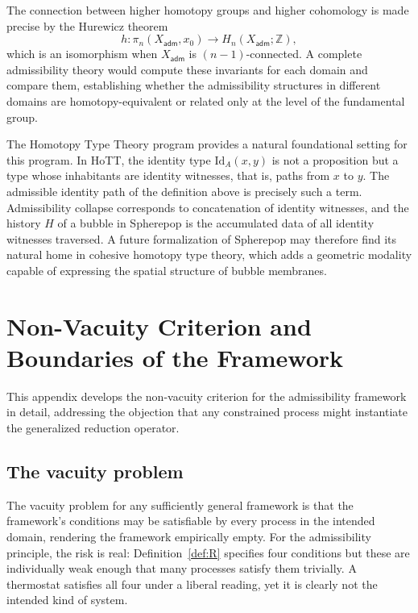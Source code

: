 \documentclass[12pt, a4paper]{article}
\theoremstyle{plain}
\theoremstyle{definition}
\theoremstyle{remark}
\begin{document}
The connection between higher homotopy groups and higher cohomology is made precise
by the Hurewicz theorem
\[
  h : \pi_n(X_{\mathsf{adm}}, x_0) \to H_n(X_{\mathsf{adm}}; \mathbb{Z}),
\]
which is an isomorphism when $X_{\mathsf{adm}}$ is $(n-1)$-connected. A complete
admissibility theory would compute these invariants for each domain and compare them,
establishing whether the admissibility structures in different domains are
homotopy-equivalent or related only at the level of the fundamental group.

The Homotopy Type Theory program provides a natural foundational setting for this
program. In HoTT, the identity type $\mathrm{Id}_A(x,y)$ is not a proposition but a
type whose inhabitants are identity witnesses, that is, paths from $x$ to $y$. The
admissible identity path of the definition above is precisely such a term.
Admissibility collapse corresponds to concatenation of identity witnesses, and the
history $H$ of a bubble in Spherepop is the accumulated data of all identity witnesses
traversed. A future formalization of Spherepop may therefore find its natural home in
cohesive homotopy type theory, which adds a geometric modality capable of expressing
the spatial structure of bubble membranes.

\section{Non-Vacuity Criterion and Boundaries of the Framework}
\label{app:nonvacuity}

This appendix develops the non-vacuity criterion for the admissibility framework in
detail, addressing the objection that any constrained process might instantiate the
generalized reduction operator.

\subsection{The vacuity problem}

The vacuity problem for any sufficiently general framework is that the framework's
conditions may be satisfiable by every process in the intended domain, rendering the
framework empirically empty. For the admissibility principle, the risk is real:
Definition~\ref{def:R} specifies four conditions but these are individually weak enough
that many processes satisfy them trivially. A thermostat satisfies all four under a
liberal reading, yet it is clearly not the intended kind of system.
\end{document}
